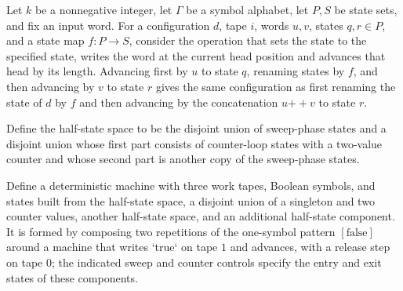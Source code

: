 \begin{theorem}
\label{Turing.rt_advanceCfg_append}
\leanok
{}
Let $k$ be a nonnegative integer, let $\Gamma$ be a symbol alphabet, let $P,S$ be state
sets, and fix an input word. For a configuration $d$, tape $i$, words $u,v$, states
$q,r\in P$, and a state map $f:P\to S$, consider the operation that sets the state to
the specified state, writes the word at the current head position and advances that head
by its length. Advancing first by $u$ to state $q$, renaming states by $f$, and then
advancing by $v$ to state $r$ gives the same configuration as first renaming the state
of $d$ by $f$ and then advancing by the concatenation $u\mathbin{+\!\!+}v$ to state $r$.
\end{theorem}

\begin{definition}
\label{Turing.rt_halfState}
\leanok
{}
Define the half-state space to be the disjoint union of sweep-phase states and a
disjoint union whose first part consists of counter-loop states with a two-value counter
and whose second part is another copy of the sweep-phase states.
\end{definition}

\begin{definition}
\label{Turing.rt_windowAdvTM}
\leanok
{}
Define a deterministic machine with three work tapes, Boolean symbols, and states built
from the half-state space, a disjoint union of a singleton and two counter values,
another half-state space, and an additional half-state component. It is formed by
composing two repetitions of the one-symbol pattern $[\mathrm{false}]$ around a machine
that writes `true` on tape $1$ and advances, with a release step on tape $0$; the
indicated sweep and counter controls specify the entry and exit states of these
components.
\end{definition}


